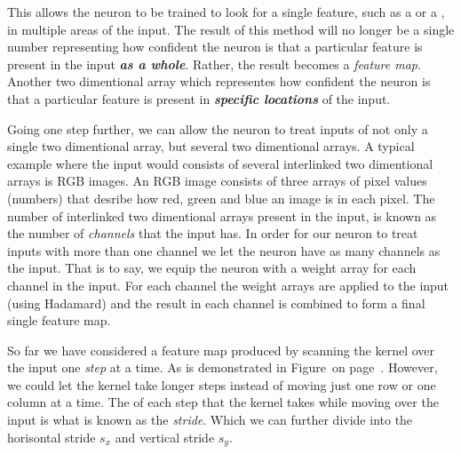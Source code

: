 This allows the neuron to be trained to look for a single feature, such as a  or a , in multiple areas of the input.
The result of this method will no longer be a single number representing how  confident the neuron is that a particular feature is present in the input {\em\bf as a whole}.
Rather, the result becomes a {\em feature map}.
Another two dimentional array which representes how  confident the neuron is that a particular feature is present in {\em\bf specific locations} of the input.

\startplacefigure[
    reference=conv-operation,
    title={The basic forward operation of a convolutional layer~\cite[escontrela_2018].},
    location=bottom,
]
{}{}
{}{}
{}{}
{}{}
{}{}
{}{}
{}{}
{}{}
\stopcombination
\stopplacefigure

Going one step further, we can allow the neuron to treat inputs of not only a single two dimentional array, but several two dimentional arrays.
A typical example where the input would consists of several interlinked two dimentional arrays is RGB images.
An RGB image consists of three arrays of pixel values (numbers) that desribe how red, green and blue an image is in each pixel.
The number of interlinked two dimentional arrays present in the input, is known as the number of {\em channels} that the input has.
In order for our neuron to treat inputs with more than one channel we let the neuron have as many channels as the input.
That is to say, we equip the neuron with a weight array for each channel in the input.
For each channel the weight arrays are applied to the input (using Hadamard) and the result in each channel is combined to form a final single feature map.

\startsubsubsection[title=The stride]
So far we have considered a feature map produced by scanning the kernel over the input one {\em step} at a time.
As is demonstrated in Figure~ on page~.
However, we could let the kernel take longer steps instead of moving just one row or one column at a time.
The  of each step that the kernel takes while moving over the input is what is known as the {\em stride}.
Which we can further divide into the horisontal stride $s_x$ and vertical stride $s_y$.

